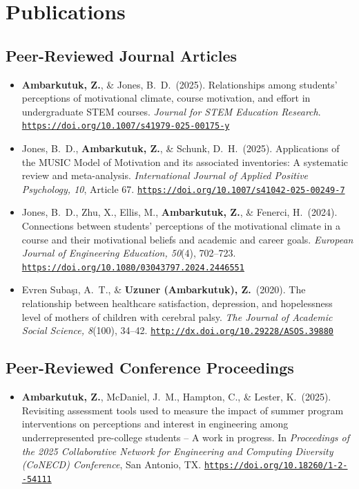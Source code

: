 \documentclass[letterpaper,11pt]{article}
\newenvironment{refs}%
  {\begin{itemize}[leftmargin=2.2em, labelwidth=1.8em, labelsep=0.4em, align=left,
                   itemsep=3pt, parsep=0pt, topsep=2pt]}%
  {\end{itemize}}
\newcommand{\me}{\textbf{Ambarkutuk, Z.}}
\newcommand{\doi}[1]{\href{https://doi.org/#1}{\nolinkurl{https://doi.org/#1}}}
\begin{document}
\section{Publications}
\subsection{Peer-Reviewed Journal Articles}
\begin{refs}
  \item[{[4]}] \me, \& Jones, B.\ D.\ (2025). Relationships among students' perceptions of motivational climate, course motivation, and effort in undergraduate STEM courses. \textit{Journal for STEM Education Research}. \doi{10.1007/s41979-025-00175-y}
  \item[{[3]}] Jones, B.\ D., \me, \& Schunk, D.\ H.\ (2025). Applications of the MUSIC Model of Motivation and its associated inventories: A systematic review and meta-analysis. \textit{International Journal of Applied Positive Psychology, 10}, Article 67. \doi{10.1007/s41042-025-00249-7}
  \item[{[2]}] Jones, B.\ D., Zhu, X., Ellis, M., \me, \& Fenerci, H.\ (2024). Connections between students' perceptions of the motivational climate in a course and their motivational beliefs and academic and career goals. \textit{European Journal of Engineering Education, 50}(4), 702--723. \doi{10.1080/03043797.2024.2446551}
  \item[{[1]}] Evren Subaşı, A.\ T., \& \textbf{Uzuner (Ambarkutuk), Z.}\ (2020). The relationship between healthcare satisfaction, depression, and hopelessness level of mothers of children with cerebral palsy. \textit{The Journal of Academic Social Science, 8}(100), 34--42. \href{http://dx.doi.org/10.29228/ASOS.39880}{\nolinkurl{http://dx.doi.org/10.29228/ASOS.39880}}
\end{refs}

\subsection{Peer-Reviewed Conference Proceedings}
\begin{refs}
  \item[{[1]}] \me, McDaniel, J.\ M., Hampton, C., \& Lester, K.\ (2025). Revisiting assessment tools used to measure the impact of summer program interventions on perceptions and interest in engineering among underrepresented pre-college students -- A work in progress. In \textit{Proceedings of the 2025 Collaborative Network for Engineering and Computing Diversity (CoNECD) Conference}, San Antonio, TX. \doi{10.18260/1-2--54111}
\end{refs}
\end{document}
